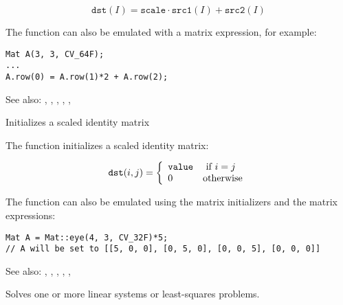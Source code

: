 \[
\texttt{dst}(I)=\texttt{scale} \cdot \texttt{src1}(I) + \texttt{src2}(I)
\]

The function can also be emulated with a matrix expression, for example:

\begin{lstlisting}
Mat A(3, 3, CV_64F);
...
A.row(0) = A.row(1)*2 + A.row(2);
\end{lstlisting}

See also: , , , , , 

Initializes a scaled identity matrix

\begin{description}
\end{description}

The function  initializes a scaled identity matrix:

\[
\texttt{dst}(i,j)=\left\{ \begin{array}{l l} \texttt{value} & \mbox{ if $i=j$}\\ 0 & \mbox{otherwise}\\ \end{array} \right.
\]

The function can also be emulated using the matrix initializers and the matrix expressions:
\begin{lstlisting}
Mat A = Mat::eye(4, 3, CV_32F)*5;
// A will be set to [[5, 0, 0], [0, 5, 0], [0, 0, 5], [0, 0, 0]]
\end{lstlisting}

See also: , , ,
, ,

Solves one or more linear systems or least-squares problems.

